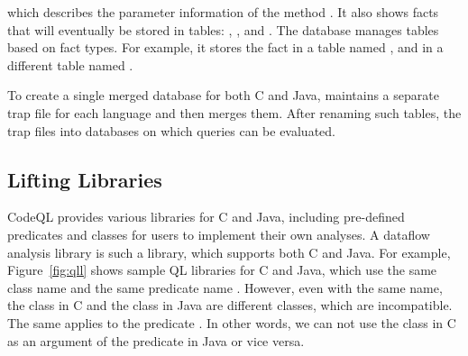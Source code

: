 \noindent
which describes the parameter information of the method .
It also shows facts that will eventually be stored in tables:
, , and
.
The database manages tables based on fact types. For example, it stores
the fact  in a table named , and
 in a different table named .


To create a single merged database for both C and Java, \ours maintains a
separate trap file for each language and then merges them.  
After renaming such tables,  the trap files into
databases on which queries can be evaluated.


\subsection{Lifting Libraries}

CodeQL provides various libraries for C and Java, including
pre-defined predicates and classes for users to implement their own analyses.
A dataflow analysis library is such a library, which supports both C and Java.
For example, Figure~\ref{fig:qll} shows sample QL libraries for C and Java,
which use the same class name  and the same predicate
name .
However, even with the same name, the class  in C and the
class  in Java are different classes, which are incompatible.
The same applies to the predicate .
In other words, we can not use the class  in C as an
argument of the predicate  in Java or vice versa.

